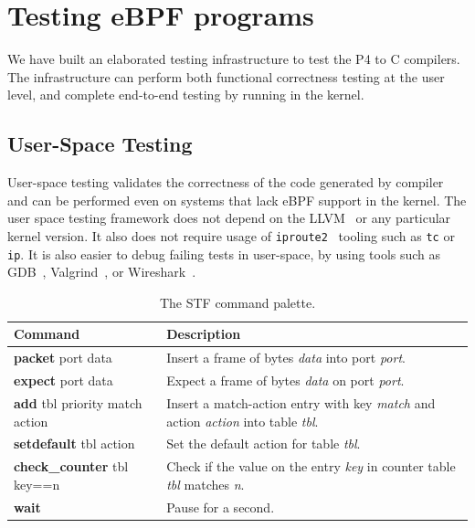 \section{Testing eBPF programs}\label{sec:testing}

We have built an elaborated testing infrastructure to test the P4 to C
compilers.  The infrastructure can perform both functional correctness
testing at the user level, and complete end-to-end testing by running
in the kernel.

\subsection{User-Space Testing}

User-space testing validates the correctness of the code generated by
compiler and can be performed even on systems that lack eBPF support
in the kernel.  The user space testing framework does not depend on
the LLVM~\cite{llvm} or any particular kernel version.  It also does
not require usage of \texttt{iproute2}~\cite{iproute} tooling such as
\texttt{tc} or \texttt{ip}.  It is also easier to debug failing tests
in user-space, by using tools such as GDB~\cite{gdb},
Valgrind~\cite{valgrind}, or Wireshark~\cite{wireshark}.

\begin{table}[h]
  \footnotesize
  \begin{center}
    \begin{tabular}{|p{3cm}|p{4.5cm}|} \hline
      \textbf{Command} & \textbf{Description} \\ \hline \hline
      \textbf{packet} port data & Insert a frame of bytes
      \textit{data} into port \textit{port}.    \\ \hline
      \textbf{expect} port data & Expect a frame of bytes
      \textit{data} on port \textit{port}.  \\ \hline
      \textbf{add} tbl priority match action & Insert a
      match-action entry with key \textit{match} and action
      \textit{action} into table \textit{tbl}. \\ \hline
      \textbf{setdefault} tbl action & Set the default action for table
      \textit{tbl}. \\
      \hline
      \textbf{check\_counter} tbl key==n & Check if the value on
      the entry \textit{key} in counter table \textit{tbl} matches
      \textit{n}.  \\
      \hline
      \textbf{wait} & Pause for a second. \\ \hline
    \end{tabular}
    \caption{The STF command palette.}\label{table:stf}
  \end{center}
\end{table}

